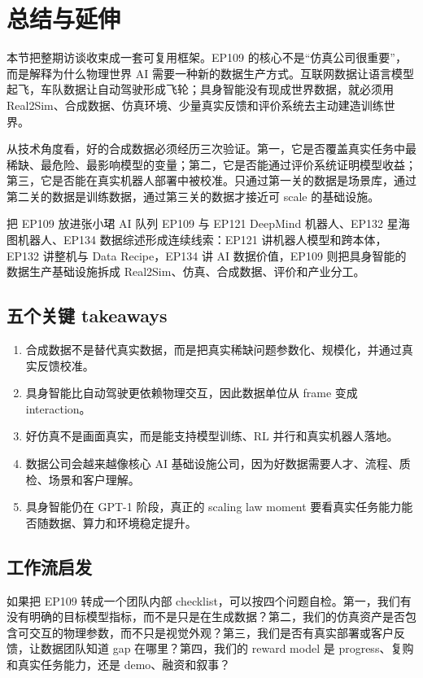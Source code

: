 \section{总结与延伸}

本节把整期访谈收束成一套可复用框架。EP109 的核心不是“仿真公司很重要”，而是解释为什么物理世界 AI 需要一种新的数据生产方式。互联网数据让语言模型起飞，车队数据让自动驾驶形成飞轮；具身智能没有现成世界数据，就必须用 Real2Sim、合成数据、仿真环境、少量真实反馈和评价系统去主动建造训练世界。

从技术角度看，好的合成数据必须经历三次验证。第一，它是否覆盖真实任务中最稀缺、最危险、最影响模型的变量；第二，它是否能通过评价系统证明模型收益；第三，它是否能在真实机器人部署中被校准。只通过第一关的数据是场景库，通过第二关的数据是训练数据，通过第三关的数据才接近可 scale 的基础设施。

\begin{importantbox}{把 EP109 放进张小珺 AI 队列}
EP109 与 EP121 DeepMind 机器人、EP132 星海图机器人、EP134 数据综述形成连续线索：EP121 讲机器人模型和跨本体，EP132 讲整机与 Data Recipe，EP134 讲 AI 数据价值，EP109 则把具身智能的数据生产基础设施拆成 Real2Sim、仿真、合成数据、评价和产业分工。
\end{importantbox}

\subsection{五个关键 takeaways}

\begin{enumerate}
\item 合成数据不是替代真实数据，而是把真实稀缺问题参数化、规模化，并通过真实反馈校准。
\item 具身智能比自动驾驶更依赖物理交互，因此数据单位从 frame 变成 interaction。
\item 好仿真不是画面真实，而是能支持模型训练、RL 并行和真实机器人落地。
\item 数据公司会越来越像核心 AI 基础设施公司，因为好数据需要人才、流程、质检、场景和客户理解。
\item 具身智能仍在 GPT-1 阶段，真正的 scaling law moment 要看真实任务能力能否随数据、算力和环境稳定提升。
\end{enumerate}

\subsection{工作流启发}

如果把 EP109 转成一个团队内部 checklist，可以按四个问题自检。第一，我们有没有明确的目标模型指标，而不是只是在生成数据？第二，我们的仿真资产是否包含可交互的物理参数，而不只是视觉外观？第三，我们是否有真实部署或客户反馈，让数据团队知道 gap 在哪里？第四，我们的 reward model 是 progress、复购和真实任务能力，还是 demo、融资和叙事？


